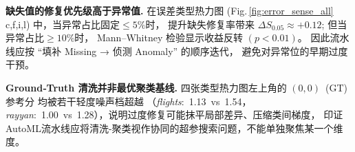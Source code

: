 \documentclass[10pt]{article} %
\numberwithin{equation}{section}
\begin{document}
\medskip
\noindent%
\textbf{缺失值的修复优先级高于异常值.}\;
在误差类型热力图 (Fig.\,\ref{fig:error_sense_all}\,c,f,i,l)
中，当异常占比固定\(\leq5\%\)时，
提升缺失修复率带来
\(\Delta S_{0.05}\approx+0.12\);
但当异常占比\(\geq10\%\)时，
Mann–Whitney 检验显示收益反转 \((p<0.01)\)。
因此流水线应按 “填补 Missing → 侦测 Anomaly” 的顺序迭代，
避免对异常位的早期过度干预。

\medskip
\noindent%
\textbf{Ground‑Truth 清洗并非最优聚类基线.}\;
四张类型热力图左上角的 \((0,0)\) (GT) 参考分
均被若干轻度噪声档超越
（\textit{flights}: 1.13 vs 1.54，\textit{rayyan}: 1.00 vs 1.28），说明过度修复可能抹平局部差异、压缩类间梯度，
印证AutoML流水线应将清洗-聚类视作协同的超参搜索问题，不能单独聚焦某一个维度。

\end{document}
